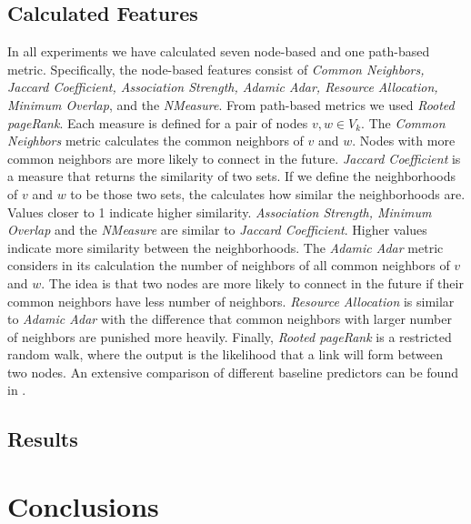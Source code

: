 \documentclass{acm_proc_article-sp}
\begin{document}
\subsection{Calculated Features}
In all experiments we have calculated seven node-based and one path-based metric. Specifically, the node-based features consist of \textit{Common Neighbors, Jaccard Coefficient, Association Strength, Adamic Adar, Resource Allocation, Minimum Overlap}, and the \textit{NMeasure}. From path-based metrics we used \textit{Rooted pageRank}. Each measure is defined for a pair of nodes ${v,w} \in V_k$. The \textit{Common Neighbors} metric calculates the common neighbors of $v$ and $w$. Nodes with more common neighbors are more likely to connect in the future. \textit{Jaccard Coefficient} is a measure that returns the similarity of two sets. If we define the neighborhoods of $v$ and $w$ to be those two sets, the  calculates how similar the neighborhoods are. Values closer to 1 indicate higher similarity. \textit{Association Strength, Minimum Overlap} and the \textit{NMeasure} are similar to \textit{Jaccard Coefficient}. Higher values indicate more similarity between the neighborhoods. The \textit{Adamic Adar} metric considers in its calculation the number of neighbors of all common neighbors of $v$ and $w$. The idea is that two nodes are more likely to connect in the future if their common neighbors have less number of neighbors. \textit{Resource Allocation} is similar to \textit{Adamic Adar} with the difference that common neighbors with larger number of neighbors are punished more heavily. Finally, \textit{Rooted pageRank} is a restricted random walk, where the output is the likelihood that a link will form between two nodes. An extensive comparison of different baseline predictors can be found in \cite{Liben-Nowell:2003:LPP:956863.956972}.

\subsection{Results}


\section{Conclusions}

\end{document}
